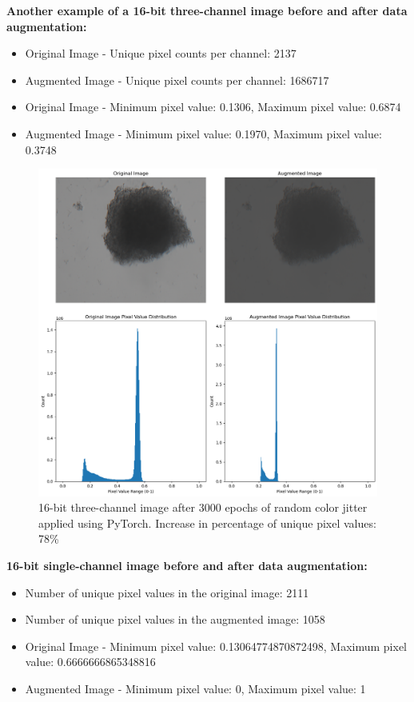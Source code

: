 \documentclass[12pt,twoside,a4paper,parskip]{scrbook} %
\begin{document}
\textbf{Another example of a 16-bit three-channel image before and after data augmentation:}

\begin{itemize}
  \item Original Image - Unique pixel counts per channel: 2137
  \item Augmented Image - Unique pixel counts per channel: 1686717
  \item Original Image - Minimum pixel value: 0.1306, Maximum pixel value: 0.6874
  \item Augmented Image -  Minimum pixel value: 0.1970, Maximum pixel value: 0.3748
\end{itemize}

\begin{figure}[H]
  \centering
  \includegraphics[scale=0.5]{figures/16bithree2.png} 
  \caption{16-bit three-channel image after 3000 epochs of random color jitter applied using PyTorch. Increase in percentage of unique pixel values: 78\%}
  \label{fig:16bit_three_version2}
\end{figure}

\textbf{16-bit single-channel image before and after data augmentation:}
\begin{itemize}
  \item Number of unique pixel values in the original image: 2111
  \item Number of unique pixel values in the augmented image: 1058
  \item Original Image - Minimum pixel value:  0.13064774870872498, Maximum pixel value: 0.6666666865348816
  \item Augmented Image - Minimum pixel value: 0, Maximum pixel value: 1
\end{itemize}
\end{document}

